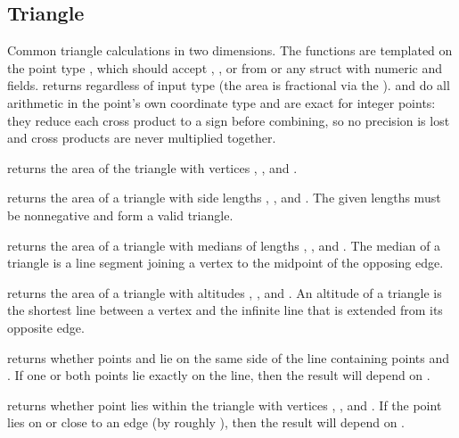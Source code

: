 \subsection{Triangle}
\label{sec:7.1.4}
Common triangle calculations in two dimensions. The functions are templated on the point type , which should accept , , or  from  or any struct with numeric  and  fields.  returns  regardless of input type (the area is fractional via the ).  and  do all arithmetic in the point's own coordinate type and are exact for integer points: they reduce each cross product to a sign before combining, so no precision is lost and cross products are never multiplied together.

\begin{compactitem}
  \item {} returns the area of the triangle with vertices , , and .
  \item {} returns the area of a triangle with side lengths , , and . The given lengths must be nonnegative and form a valid triangle.
  \item {} returns the area of a triangle with medians of lengths , , and . The median of a triangle is a line segment joining a vertex to the midpoint of the opposing edge.
  \item {} returns the area of a triangle with altitudes , , and . An altitude of a triangle is the shortest line between a vertex and the infinite line that is extended from its opposite edge.
  \item {} returns whether points  and  lie on the same side of the line containing points  and . If one or both points lie exactly on the line, then the result will depend on .
  \item {} returns whether point  lies within the triangle with vertices , , and . If the point lies on or close to an edge (by roughly ), then the result will depend on .
\end{compactitem}

